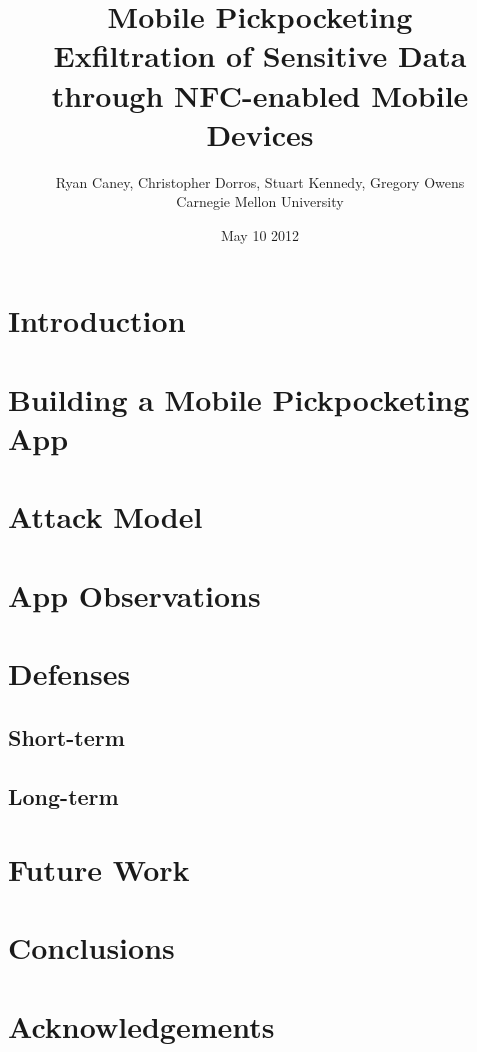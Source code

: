 \documentclass[11pt]{article}
\title{Mobile Pickpocketing \\ \normalsize{Exfiltration of Sensitive Data through NFC-enabled Mobile Devices}}
\author{Ryan Caney, Christopher Dorros, Stuart Kennedy, Gregory Owens \\ Carnegie Mellon University}
\date{May 10 2012}
\begin{document}
\begin{singlespace}
\maketitle
\end{singlespace} 


\section{Introduction}

\section{Building a Mobile Pickpocketing App}

\section{Attack Model}

\section{App Observations}

\section{Defenses}
\subsection{Short-term}

\subsection{Long-term}

\section{Future Work}

\section{Conclusions}

\section{Acknowledgements}


%
%



\nocite{*}
\end{document}
